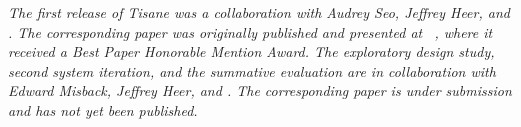 

\textit{The first release of Tisane was a collaboration with Audrey Seo, Jeffrey
Heer, and \reneJust. The corresponding paper was originally published and presented at
~\cite{jun2022tisane}, where it received a \textit{Best Paper Honorable
Mention Award}. The exploratory design study, second system iteration, and the
summative evaluation are in collaboration with Edward Misback, Jeffrey Heer, and
\reneJust. The corresponding paper is under submission and has not yet been published.}
